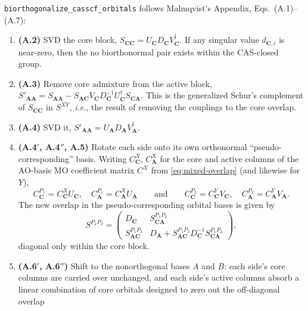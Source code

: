 \documentclass[aip,jcp,preprint]{revtex4-1}
\begin{document}
\texttt{biorthogonalize\_casscf\_orbitals} follows Malmqvist's Appendix,
Eqs.~(A.1)--(A.7):

\begin{enumerate}
\item \textbf{(A.2)} SVD the core block, $S_{\mathbf{C}\mathbf{C}}=U_{\mathbf{C}} D_{\mathbf{C}} V_{\mathbf{C}}^\dagger$.
If any singular value $d_{\mathbf{C},i}$ is near-zero, then the no biorthonormal pair exists within the CAS-closed group.
\item \textbf{(A.3)} Remove core admixture from the active block,
$S'_{\mathbf{A}\mathbf{A}} = S_{\mathbf{A}\mathbf{A}} - S_{\mathbf{A}\mathbf{C}} V_{\mathbf{C}} D_{\mathbf{C}}^{-1} U_{\mathbf{C}}^\dagger S_{\mathbf{C}\mathbf{A}}$.
This is the generalized Schur's complement of $S_{\mathbf{CC}}$ in $S^{XY}$, \textit{i.e.}, the result of removing the couplings to the core overlap.
\item \textbf{(A.4)} SVD it, $S'_{\mathbf{A}\mathbf{A}}=U_{\mathbf{A}} D_{\mathbf{A}} V_{\mathbf{A}}^\dagger$.
\item \textbf{(A.4$'$, A.4$''$, A.5)} Rotate each side onto its own orthonormal
``pseudo-corresponding'' basis. Writing $C^X_{\mathbf{C}}$, $C^X_{\mathbf{A}}$ for the
core and active columns of the AO-basis MO coefficient matrix $C^X$ from
\cref{eq:mixed-overlap} (and likewise for $Y$),
\begin{equation}
 C^{P_1}_{\mathbf{C}} = C^{X}_{\mathbf{C}} U_{\mathbf{C}}, \quad
 C^{P_1}_{\mathbf{A}} = C^{X}_{\mathbf{A}} U_{\mathbf{A}}
 \qquad\text{and}\qquad
 C^{P_2}_{\mathbf{C}} = C^{Y}_{\mathbf{C}} V_{\mathbf{C}}, \quad
 C^{P_2}_{\mathbf{A}} = C^{Y}_{\mathbf{A}} V_{\mathbf{A}}.
\end{equation}
The new overlap in the pseudo-corresponding orbital bases is given by
\begin{equation}
\label{eq:pcovlp}
 S^{P_1P_2} = \begin{pmatrix}
 D_{\mathbf{C}} & S^{P_1P_2}_{\mathbf{C}\mathbf{A}} \\
 S^{P_1P_2}_{\mathbf{A}\mathbf{C}} & D_{\mathbf{A}} + S^{P_1P_2}_{\mathbf{A}\mathbf{C}} D_{\mathbf{C}}^{-1} S^{P_1P_2}_{\mathbf{C}\mathbf{A}}
 \end{pmatrix},
\end{equation}
diagonal only within the core block.
\item \textbf{(A.6$'$, A.6$''$)} Shift to the nonorthogonal bases $A$ and $B$: each side's
core columns are carried over unchanged, and each side's active columns absorb
a linear combination of core orbitals designed to zero out the off-diagonal overlap

\end{enumerate}
\end{document}
